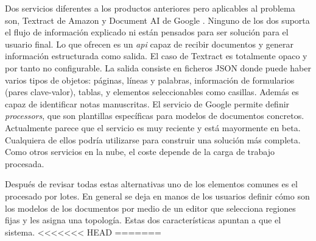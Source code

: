 Dos servicios diferentes a los productos anteriores pero aplicables al problema son, Textract de Amazon \cite{solucionesComerciales_amazon_textract} y Document AI de Google \cite{solucionesComerciales_google_documentAI}. Ninguno de los dos suporta el flujo de información explicado ni están pensados para ser solución para el usuario final. Lo que ofrecen es un \emph{\acrlong{api}} capaz de recibir documentos y generar información estructurada como salida. El caso de Textract es totalmente opaco y por tanto no configurable. La salida consiste en ficheros JSON donde puede haber varios tipos de objetos: páginas, líneas y palabras, información de formularios (pares clave-valor), tablas, y elementos seleccionables como casillas. Además es capaz de identificar notas manuscritas. El servicio de Google permite definir \emph{processors}, que son plantillas específicas para modelos de documentos concretos. Actualmente parece que el servicio es muy reciente y está mayormente en beta. Cualquiera de ellos podría utilizarse para construir una solución más completa. Como otros servicios en la nube, el coste depende de la carga de trabajo procesada.

Después de revisar todas estas alternativas uno de los elementos comunes es el procesado por lotes. En general se deja en manos de los usuarios definir cómo son los modelos de los documentos por medio de un editor que selecciona regiones fijas y les asigna una topología. Estas dos características apuntan a que el sistema.
<<<<<<< HEAD
=======

